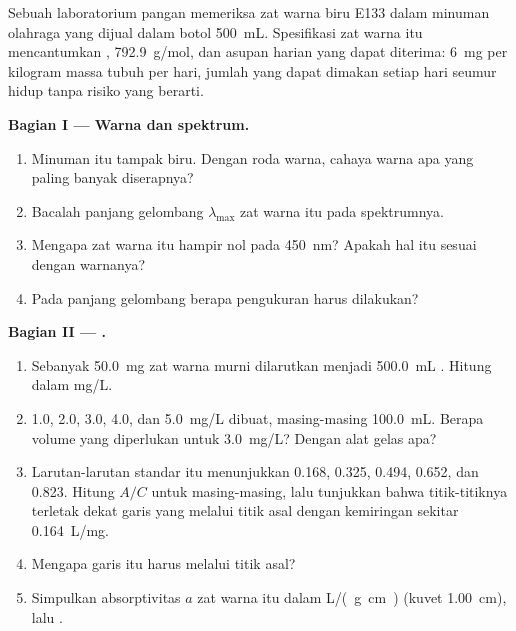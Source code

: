 \begin{problem}
\label{pb:g11:absorbance:1}
Sebuah laboratorium pangan memeriksa zat warna biru E133 dalam minuman
olahraga yang dijual dalam botol \qty{500}{mL}. Spesifikasi zat warna itu
mencantumkan , \qty{792.9}{g/mol}, dan asupan harian yang
dapat diterima: \qty{6}{mg} per kilogram massa tubuh per hari, jumlah
yang dapat dimakan setiap hari seumur hidup tanpa risiko yang berarti.

\medskip
\noindent\textbf{Bagian I --- Warna dan spektrum.}
\begin{enumerate}
  \item Minuman itu tampak biru. Dengan roda warna, cahaya warna apa
        yang paling banyak diserapnya?
  \item Bacalah panjang gelombang $\lambda_{\max}$ zat warna itu pada
        spektrumnya.
  \item Mengapa  zat warna itu hampir nol pada \qty{450}{nm}?
        Apakah hal itu sesuai dengan warnanya?
  \item Pada panjang gelombang berapa pengukuran harus dilakukan?
\end{enumerate}

\medskip
\noindent\textbf{Bagian II --- .}
\begin{enumerate}[resume]
  \item Sebanyak \qty{50.0}{mg} zat warna murni dilarutkan menjadi
        \qty{500.0}{mL} . Hitung  dalam
        \si{mg/L}.
  \item {} 1.0, 2.0, 3.0, 4.0, dan \qty{5.0}{mg/L} dibuat,
        masing-masing \qty{100.0}{mL}. Berapa volume  yang
        diperlukan untuk  \qty{3.0}{mg/L}? Dengan alat
        gelas apa?
  \item Larutan-larutan standar itu menunjukkan 0.168, 0.325, 0.494,
        0.652, dan 0.823. Hitung $A / C$ untuk masing-masing, lalu
        tunjukkan bahwa titik-titiknya terletak dekat garis yang melalui
        titik asal dengan kemiringan sekitar \qty{0.164}{L/mg}.
  \item Mengapa garis itu harus melalui titik asal?
  \item Simpulkan absorptivitas $a$ zat warna itu dalam \si{L/(g.cm)}
        (kuvet \qty{1.00}{cm}), lalu .
\end{enumerate}


\end{problem}
